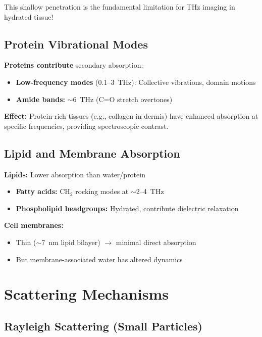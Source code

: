 This shallow penetration is the fundamental limitation for THz imaging in hydrated tissue!

\subsection{Protein Vibrational Modes}
\label{subsec:protein-vibrational}

\textbf{Proteins contribute} secondary absorption:
\begin{itemize}
\item \textbf{Low-frequency modes} (0.1--3~THz): Collective vibrations, domain motions
\item \textbf{Amide bands:} $\sim$6~THz (C=O stretch overtones)
\end{itemize}

\textbf{Effect:} Protein-rich tissues (e.g., collagen in dermis) have enhanced absorption at specific frequencies, providing spectroscopic contrast.

\subsection{Lipid and Membrane Absorption}
\label{subsec:lipid-membrane}

\textbf{Lipids:} Lower absorption than water/protein
\begin{itemize}
\item \textbf{Fatty acids:} CH$_2$ rocking modes at $\sim$2--4~THz
\item \textbf{Phospholipid headgroups:} Hydrated, contribute dielectric relaxation
\end{itemize}

\textbf{Cell membranes:}
\begin{itemize}
\item Thin ($\sim$7~nm lipid bilayer) $\rightarrow$ minimal direct absorption
\item But membrane-associated water has altered dynamics
\end{itemize}

\section{Scattering Mechanisms}
\label{sec:scattering-mechanisms}

\subsection{Rayleigh Scattering (Small Particles)}
\label{subsec:rayleigh-scattering}


